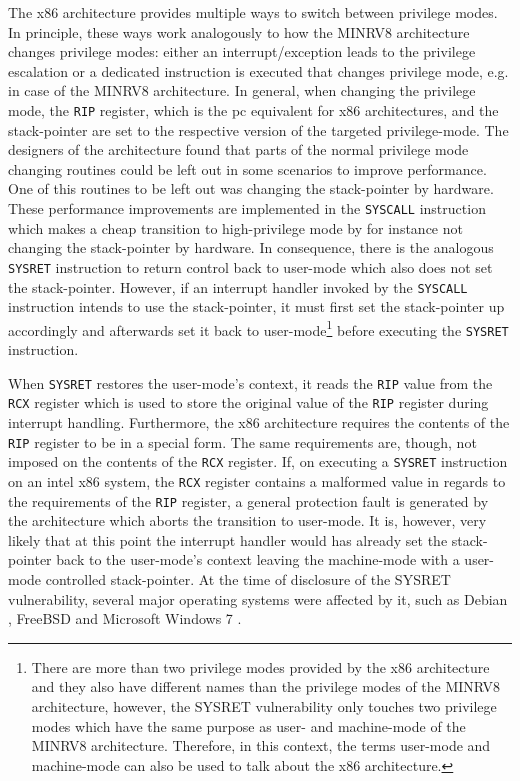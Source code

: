 The x86 architecture provides multiple ways to switch between privilege modes.
In principle, these ways work analogously to how the MINRV8 architecture changes privilege modes: either an interrupt/exception leads to the privilege escalation or a dedicated instruction is executed that changes privilege mode, e.g.  in case of the MINRV8 architecture.
In general, when changing the privilege mode, the \lstinline{RIP} register, which is the \gls{pc} equivalent for x86 architectures, and the stack-pointer are set to the respective version of the targeted privilege-mode.
The designers of the architecture found that parts of the normal privilege mode changing routines could be left out in some scenarios to improve performance.
One of this routines to be left out was changing the stack-pointer by hardware.
These performance improvements are implemented in the \lstinline{SYSCALL} instruction which makes a cheap transition to high-privilege mode by for instance not changing the stack-pointer by hardware.
In consequence, there is the analogous \lstinline{SYSRET} instruction to return control back to user-mode which also does not set the stack-pointer.
However, if an interrupt handler invoked by the \lstinline{SYSCALL} instruction intends to use the stack-pointer, it must first set the stack-pointer up accordingly and afterwards set it back to user-mode\footnote{%
    There are more than two privilege modes provided by the x86 architecture and they also have different names than the privilege modes of the MINRV8 architecture, however, the SYSRET vulnerability only touches two privilege modes which have the same purpose as user- and machine-mode of the MINRV8 architecture.
    Therefore, in this context, the terms user-mode and machine-mode can also be used to talk about the x86 architecture.
} before executing the \lstinline{SYSRET} instruction.

When \lstinline{SYSRET} restores the user-mode's context, it reads the \lstinline{RIP} value from the \lstinline{RCX} register which is used to store the original value of the \lstinline{RIP} register during interrupt handling.
Furthermore, the x86 architecture requires the contents of the \lstinline{RIP} register to be in a special form.
The same requirements are, though, not imposed on the contents of the \lstinline{RCX} register.
If, on executing a \lstinline{SYSRET} instruction on an intel x86 system, the \lstinline{RCX} register contains a malformed value in regards to the requirements of the \lstinline{RIP} register, a general protection fault is generated by the architecture which aborts the transition to user-mode.
It is, however, very likely that at this point the interrupt handler would has already set the stack-pointer back to the user-mode's context leaving the machine-mode with a user-mode controlled stack-pointer.
At the time of disclosure of the SYSRET vulnerability, several major operating systems were affected by it, such as Debian \cite{SYSRETDebian}, FreeBSD \cite{SYSRETFreeBSD} and Microsoft Windows 7 \cite{SYSRETMicrosoft}.

